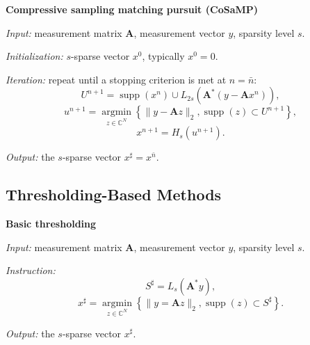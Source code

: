 \begin{mdframed}
    \label{CoSaMP}
    \begin{center}
        \textbf{\textcolor[rgb]{1,0,0}{Compressive sampling matching pursuit (CoSaMP)}}
    \end{center}
        \emph{Input:} measurement matrix $\mathbf{A}$, measurement vector $y$, sparsity level $s$.

        \emph{Initialization:} $s$-sparse vector $x^0$, typically $x^0 = 0$.

        \emph{Iteration:} repeat until a stopping criterion is met at $n = \bar{n}$:
        \begin{equation}
            U^{n+1} = \mathop{\mathrm{supp}}(x^n) \cup L_{2s}(\mathbf{A}^*(y - \mathbf{A}x^n)), \tag{CoSaMP$_1$} 
            \label{eqcosamp1}
        \end{equation}
        \begin{equation}
            u^{n+1} = \mathop{\mathrm{argmin}}\limits_{z \in \mathbb{C}^N} \left\{ \|y - \mathbf{A}z\|_{2}, \mathop{\mathrm{supp}}(z) \subset U^{n+1} \right\}, \tag{CoSaMP$_2$}
            \label{eqcosamp2}
        \end{equation}
        \begin{equation}
            x^{n+1} = H_s(u^{n+1}). \tag{CoSaMP$_3$}
            \label{eqcosamp3}
        \end{equation}
        
        \emph{Output:} the $s$-sparse vector $x^{\sharp} = x^{\bar{n}}$.
\end{mdframed}

\subsection{Thresholding-Based Methods}

\begin{mdframed}
    \label{basicthresholding}
\begin{center}
    \textbf{\textcolor[rgb]{1,0,0}{Basic thresholding}}
\end{center}
    \emph{Input:} measurement matrix $\mathbf{A}$, measurement vector $y$, sparsity level $s$.

    \emph{Instruction:} 
    \begin{equation}
        S^{\sharp} = L_s(\mathbf{A}^*y), \tag{BT$_1$}
        \label{eqbt1}
    \end{equation}
    \begin{equation}
        x^{\sharp} = \mathop{\mathrm{argmin}}\limits_{z \in \mathbb{C}^N} \left\{ \|y = \mathbf{A}z\|_2, \mathop{\mathrm{supp}}(z) \subset S^{\sharp} \right\}. \tag{BT$_2$}
        \label{eqbt2}
    \end{equation}

    \emph{Output:} the $s$-sparse vector $x^{\sharp}$.
\end{mdframed}

